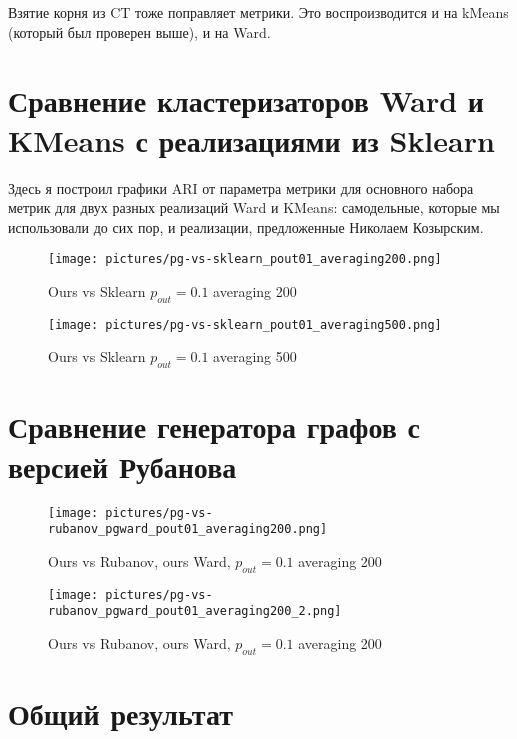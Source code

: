 \documentclass{article}
\begin{document}
Взятие корня из CT тоже поправляет метрики. Это воспроизводится и на kMeans (который был проверен выше), и на Ward.


\section{Сравнение кластеризаторов Ward и KMeans с реализациями из Sklearn}
Здесь я построил графики ARI от параметра метрики для основного набора метрик для двух разных реализаций Ward и KMeans: самодельные, которые мы использовали до сих пор, и реализации, предложенные Николаем Козырским.

\begin{figure}[H]
	\texttt{[image: pictures/pg-vs-sklearn\_pout01\_averaging200.png]}
	\caption{\label{f_vs2} Ours vs Sklearn $p_{out}=0.1$ averaging 200}
\end{figure}

\begin{figure}[H]
	\texttt{[image: pictures/pg-vs-sklearn\_pout01\_averaging500.png]}
	\caption{\label{f_vs2} Ours vs Sklearn $p_{out}=0.1$ averaging 500}
\end{figure}

\section{Сравнение генератора графов с версией Рубанова}

\begin{figure}[H]
	\texttt{[image: pictures/pg-vs-rubanov\_pgward\_pout01\_averaging200.png]}
	\caption{\label{f_vs2} Ours vs Rubanov, ours Ward, $p_{out}=0.1$ averaging 200}
\end{figure}

\begin{figure}[H]
	\texttt{[image: pictures/pg-vs-rubanov\_pgward\_pout01\_averaging200\_2.png]}
	\caption{\label{f_vs2} Ours vs Rubanov, ours Ward, $p_{out}=0.1$ averaging 200}
\end{figure}

\section*{Общий результат}
\end{document}
